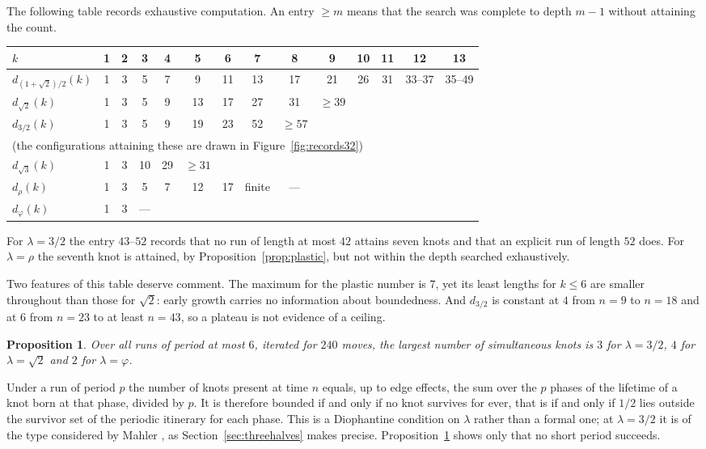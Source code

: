 \documentclass[11pt,reqno]{amsart}
\theoremstyle{plain}
\newtheorem{proposition}[theorem]{Proposition}
\theoremstyle{definition}
\theoremstyle{remark}
\begin{document}
The following table records exhaustive computation. An entry $\geq m$ means that
the search was complete to depth $m-1$ without attaining the count.

\begin{center}
\begin{tabular}{lccccccccccccc}
\toprule
$k$ & 1 & 2 & 3 & 4 & 5 & 6 & 7 & 8 & 9 & 10 & 11 & 12 & 13\\
\midrule
$d_{(1+\sqrt2)/2}(k)$ & 1 & 3 & 5 & 7 & 9 & 11 & 13 & 17 & 21 & 26 & 31 & 33--37 & 35--49\\
$d_{\sqrt2}(k)$ & 1 & 3 & 5 & 9 & 13 & 17 & 27 & 31 & $\geq39$ & & & &\\
$d_{3/2}(k)$ & 1 & 3 & 5 & 9 & 19 & 23 & 52 & $\geq57$ & & & & &\\[-1pt]
\multicolumn{14}{l}{\footnotesize (the configurations attaining these are drawn in Figure~\ref{fig:records32})}\\
$d_{\sqrt3}(k)$ & 1 & 3 & 10 & 29 & $\geq31$ & & & & & & & &\\
$d_{\rho}(k)$ & 1 & 3 & 5 & 7 & 12 & 17 & finite & --- & & & & &\\
$d_{\varphi}(k)$ & 1 & 3 & --- & & & & & & & & & &\\
\bottomrule
\end{tabular}
\end{center}

For $\lambda=3/2$ the entry $43$--$52$ records that no run of length at most
$42$ attains seven knots and that an explicit run of length $52$ does. For
$\lambda=\rho$ the seventh knot is attained, by
Proposition~\ref{prop:plastic}, but not within the depth searched exhaustively.

Two features of this table deserve comment. The maximum for the plastic number
is $7$, yet its least lengths for $k\leq6$ are smaller throughout than those for
$\sqrt2$: early growth carries no information about boundedness. And
$d_{3/2}$ is constant at $4$ from $n=9$ to $n=18$ and at $6$ from $n=23$ to at
least $n=43$, so a plateau is not evidence of a ceiling.

\begin{proposition}\label{prop:periodic}
Over all runs of period at most $6$, iterated for $240$ moves, the largest
number of simultaneous knots is $3$ for $\lambda=3/2$, $4$ for $\lambda=\sqrt2$
and $2$ for $\lambda=\varphi$.
\end{proposition}

Under a run of period $p$ the number of knots present at time $n$ equals, up to
edge effects, the sum over the $p$ phases of the lifetime of a knot born at that
phase, divided by $p$. It is therefore bounded if and only if no knot survives
for ever, that is if and only if $1/2$ lies outside the survivor set of the
periodic itinerary for each phase. This is a Diophantine condition on $\lambda$
rather than a formal one; at $\lambda=3/2$ it is of the type considered by
Mahler \cite{Mahler1968}, as Section~\ref{sec:threehalves} makes precise. Proposition~\ref{prop:periodic} shows only that no
short period succeeds.
\end{document}
